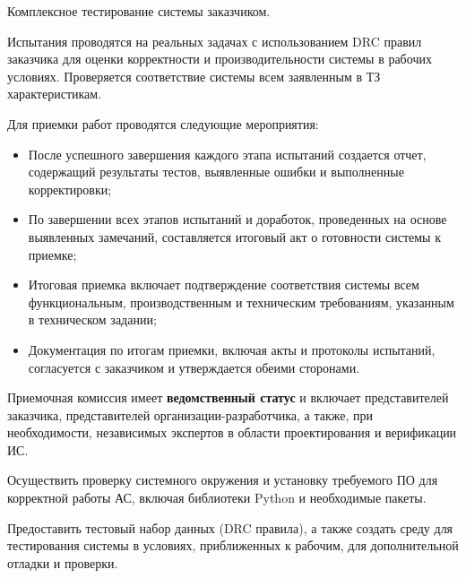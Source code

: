 Комплексное тестирование системы заказчиком.

Испытания проводятся на реальных задачах
с использованием DRC правил заказчика для оценки корректности
и производительности системы в рабочих условиях.
Проверяется соответствие системы всем заявленным в ТЗ характеристикам.


Для приемки работ проводятся следующие мероприятия:

\begin{itemize}
	\item После успешного завершения каждого этапа испытаний создается отчет,
		содержащий результаты тестов,
		выявленные ошибки и выполненные корректировки;
	\item По завершении всех этапов испытаний и доработок,
		проведенных на основе выявленных замечаний,
		составляется итоговый акт о готовности системы к приемке;
	\item Итоговая приемка включает подтверждение соответствия системы
		всем функциональным, производственным и техническим требованиям,
		указанным в техническом задании;
	\item Документация по итогам приемки, включая акты и протоколы испытаний,
		согласуется с заказчиком и утверждается обеими сторонами.
\end{itemize}


Приемочная комиссия имеет \textbf{ведомственный статус}
и включает представителей заказчика,
представителей организации-разработчика, а также, при необходимости,
независимых экспертов в области проектирования и верификации ИС.



Осуществить проверку системного окружения
и установку требуемого ПО для корректной работы АС,
включая библиотеки Python и необходимые пакеты.

Предоставить тестовый набор данных (DRC правила),
а также создать среду для тестирования системы в условиях,
приближенных к рабочим, для дополнительной отладки и проверки.


